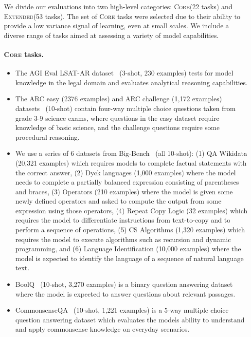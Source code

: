 \documentclass{article}
\newcommand{\lowvar}{\textsc{Core}\xspace}
\newcommand{\lowvartasks}{22\xspace}
\newcommand{\aggscore}{\textsc{Extended}\xspace}
\newcommand{\aggtasks}{53\xspace}
\begin{document}
We divide our evaluations into two high-level categories: \lowvar (\lowvartasks tasks) and \aggscore (\aggtasks tasks). The set of \lowvar tasks were selected due to their ability to provide a low variance signal of learning, even at small scales. We include a diverse range of tasks aimed at assessing a variety of model capabilities.

\paragraph{\lowvar tasks.}

\begin{itemize}
    \item
    The AGI Eval LSAT-AR dataset~\citep{zhong2023agieval} (3-shot, 230 examples) tests for model knowledge in the legal domain and evaluates analytical reasoning capabilities.
    \item
    The ARC easy (2376 examples) and ARC challenge (1,172 examples) datasets~\citep{arc} (10-shot) contain four-way multiple choice questions taken from grade 3-9 science exams, where questions in the easy dataset require knowledge of basic science, and the challenge questions require some procedural reasoning.
    \item
    We use a series of 6 datasets from Big-Bench~\citep{srivastava2023beyond} (all 10-shot): (1) QA Wikidata (20,321 examples) which requires models to complete factual statements with the correct answer, (2) Dyck languages (1,000 examples) where the model needs to complete a partially balanced expression consisting of parentheses and braces, (3) Operators (210 examples) where the model is given some newly defined operators and asked to compute the output from some expression using those operators, (4) Repeat Copy Logic (32 examples) which requires the model to differentiate instructions from text-to-copy and to perform a sequence of operations, (5) CS Algorithms (1,320 examples) which requires the model to execute algorithms such as recursion and dynamic programming, and (6) Language Identification (10,000 examples) where the model is expected to identify the language of a sequence of natural language text.
    \item
    BoolQ~\citep{boolq} (10-shot, 3,270 examples) is a binary question answering dataset where the model is expected to answer questions about relevant passages.
    \item
    CommonsenseQA~\citep{talmor-etal-2019-commonsenseqa} (10-shot, 1,221 examples) is a 5-way multiple choice question answering dataset which evaluates the models ability to understand and apply commonsense knowledge on everyday scenarios.

\end{itemize}
\end{document}
